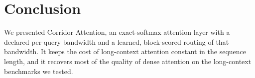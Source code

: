 \section{Conclusion}\label{sec:conclusion}

We presented Corridor Attention, an exact-softmax attention layer with a
declared per-query bandwidth and a learned, block-scored routing of that
bandwidth. It keeps the cost of long-context attention constant in the
sequence length, and it recovers most of the quality of dense
attention on the long-context benchmarks we tested.

